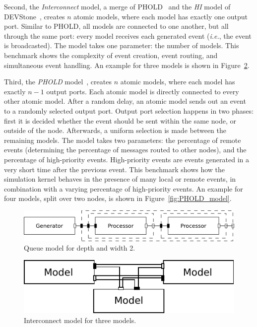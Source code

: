 Second, the \textit{Interconnect} model, a merge of PHOLD~\cite{PHOLD} and the \textit{HI} model of DEVStone~\cite{DEVStone}, creates $n$ atomic models, where each model has exactly one output port.
Similar to PHOLD, all models are connected to one another, but all through the same port: every model receives each generated event (\textit{i.e.}, the event is broadcasted).
The model takes one parameter: the number of models.
This benchmark shows the complexity of event creation, event routing, and simultaneous event handling.
An example for three models is shown in Figure~\ref{fig:interconnect_model}.

Third, the \textit{PHOLD} model~\cite{PHOLD}, creates $n$ atomic models, where each model has exactly $n-1$ output ports.
Each atomic model is directly connected to every other atomic model.
After a random delay, an atomic model sends out an event to a randomly selected output port.
Output port selection happens in two phases: first it is decided whether the event should be sent within the same node, or outside of the node.
Afterwards, a uniform selection is made between the remaining models.
The model takes two parameters: the percentage of remote events (determining the percentage of messages routed to other nodes), and the percentage of high-priority events.
High-priority events are events generated in a very short time after the previous event.
This benchmark shows how the simulation kernel behaves in the presence of many local or remote events, in combination with a varying percentage of high-priority events.
An example for four models, split over two nodes, is shown in Figure~\ref{fig:PHOLD_model}.

\begin{figure}
	\center
	\includegraphics[width=\columnwidth]{fig/queue_model_fixed.pdf}
	\caption{Queue model for depth and width 2.}
	\label{fig:queue_model}
\end{figure}
	
\begin{figure}
    \center
	\includegraphics[width=\modelfraction\columnwidth]{fig/interconnect_model.pdf}
	\caption{Interconnect model for three models.}
	\label{fig:interconnect_model}
\end{figure}

